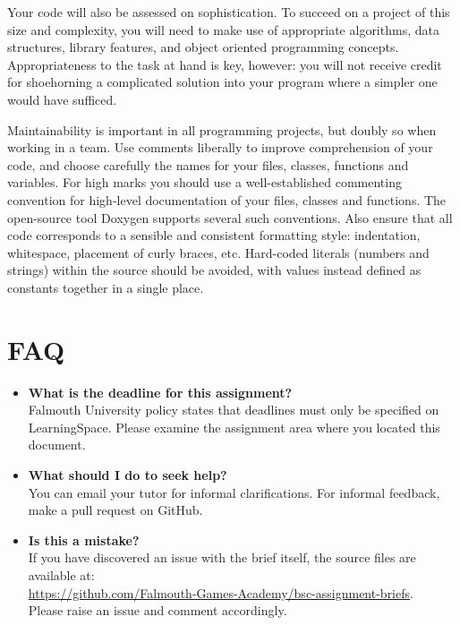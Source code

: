 \documentclass{../fal_assignment}
\begin{document}
Your code will also be assessed on sophistication. To succeed on a project of this size and complexity, you will need to make use of appropriate algorithms, data structures, library features, and object oriented programming concepts. Appropriateness to the task at hand is key, however: you will not receive credit for shoehorning a complicated solution into your program where a simpler one would have sufficed. 

Maintainability is important in all programming projects, but doubly so when working in a team. Use comments liberally to improve comprehension of your code, and choose carefully the names for your files, classes, functions and variables. For high marks you should use a well-established commenting convention for high-level documentation of your files, classes and functions. The open-source tool Doxygen supports several such conventions. Also ensure that all code corresponds to a sensible and consistent formatting style: indentation, whitespace, placement of curly braces, etc. Hard-coded literals (numbers and strings) within the source should be avoided, with values instead defined as constants together in a single place.
\section*{FAQ}

\begin{itemize}
	\item 	\textbf{What is the deadline for this assignment?} \\ 
    		Falmouth University policy states that deadlines must only be specified on LearningSpace. Please examine the assignment area where you located this document.
    		
	\item 	\textbf{What should I do to seek help?} \\ 
    		You can email your tutor for informal clarifications. For informal feedback, make a pull request on GitHub. 
    		
    	\item 	\textbf{Is this a mistake?} \\ 	
    		If you have discovered an issue with the brief itself, the source files are available at: \\
    		\url{https://github.com/Falmouth-Games-Academy/bsc-assignment-briefs}.\\
    		 Please raise an issue and comment accordingly.
\end{itemize}
\end{document}
